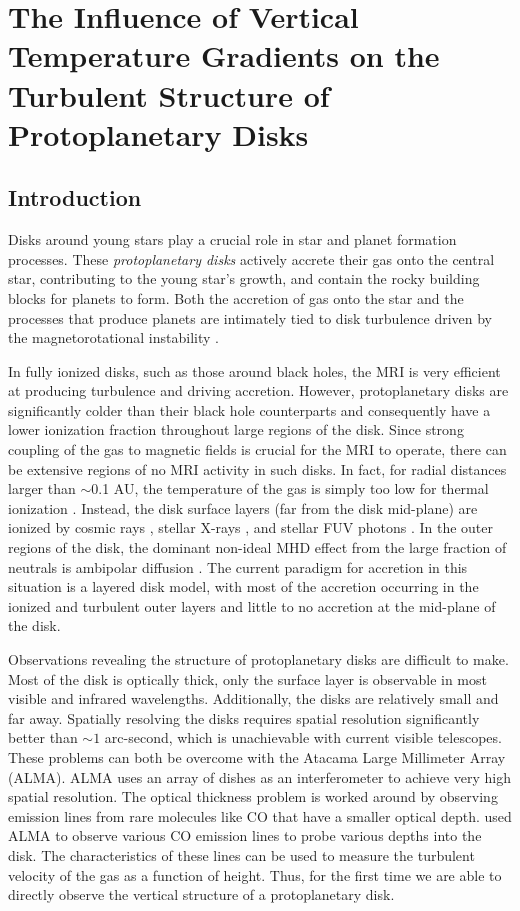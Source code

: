 \chapter{The Influence of Vertical Temperature Gradients on the Turbulent Structure of Protoplanetary Disks}
\label{adad}




\section{Introduction} 
Disks around young stars play a crucial role in star and planet formation processes.  These {\it protoplanetary disks} actively accrete their gas onto the central star, contributing to the young star's growth, and contain the rocky building blocks for planets to form.  
Both the accretion of gas onto the star and the processes that produce planets are intimately tied to {disk turbulence} driven by the magnetorotational instability \cite[MRI;][]{balbus91,balbus98}.  

In fully ionized disks, such as those around black holes, the MRI is very efficient at producing turbulence and driving accretion.  However, protoplanetary disks are significantly colder than their black hole counterparts and consequently have a lower ionization fraction throughout large regions of the disk.  Since strong coupling of the gas to magnetic fields is crucial for the MRI to operate, there can be extensive regions of no MRI activity in such disks.  In fact, for radial distances larger than $\sim$0.1 AU, the temperature of the gas is simply too low for thermal ionization \citep{umebayashi83}.  Instead, the disk surface layers (far from the disk mid-plane) are ionized by cosmic rays \citep{gammie96}, stellar X-rays \citep{igea99}, and stellar FUV photons \citep{perez-becker11b}.  In the outer regions of the disk, the dominant non-ideal MHD effect from the large fraction of neutrals is ambipolar diffusion \citep{armitage11,turner14}.  The current paradigm for accretion in this situation is a layered disk model, with most of the accretion occurring in the ionized and turbulent outer layers and little to no accretion at the mid-plane of the disk.

Observations revealing the structure of protoplanetary disks are difficult to make.  Most of the disk is optically thick, only the surface layer is observable in most visible and infrared wavelengths.  Additionally, the disks are relatively small and far away.  Spatially resolving the disks requires spatial resolution significantly better than $\sim 1$ arc-second, which is unachievable with current visible telescopes.  These problems can both be overcome with the Atacama Large Millimeter Array (ALMA).  ALMA uses an array of dishes as an interferometer to achieve very high spatial resolution.  The optical thickness problem is worked around by observing emission lines from rare molecules like CO that have a smaller optical depth.  \cite{flaherty15} used ALMA to observe various CO emission lines to probe various depths into the disk.  The characteristics of these lines can be used to measure the turbulent velocity of the gas as a function of height.  Thus, for the first time we are able to directly observe the vertical structure of a protoplanetary disk.  

